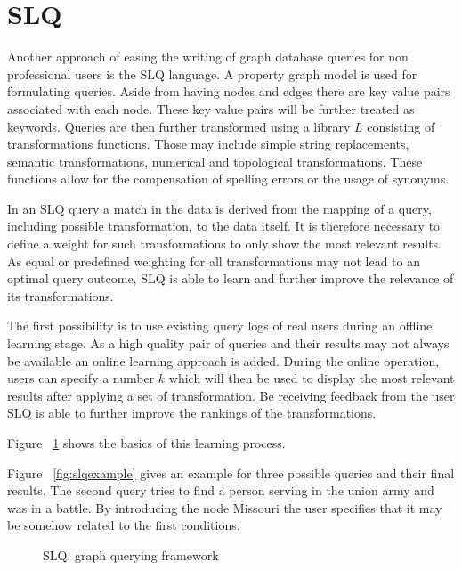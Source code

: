 \documentclass{sig-alternate}
\begin{document}
\section{SLQ}
Another approach of easing the writing of graph database queries for non
professional users is the SLQ language. 
A property graph model is used for formulating queries. Aside
from having nodes and edges there are key value pairs associated with
each node. These key value pairs will be further treated as keywords.
Queries are then further transformed using a library $L$ consisting of transformations
functions. Those may include simple string replacements, semantic transformations,
numerical and topological transformations.
These functions allow for the compensation of spelling errors or the
usage of synonyms.

In an SLQ query a match in the data is derived from the mapping
of a query, including possible transformation, to the data itself. It is therefore necessary 
to define a weight for such transformations to only show the most relevant results.
As equal or predefined weighting for all transformations may not lead to an optimal 
query outcome, SLQ is able to learn and further improve the relevance of its transformations.

The first possibility is to use existing query logs of real users during an offline learning stage.
As a high quality pair of queries and their results may not always be available an online learning approach
is added. During the online operation, users can specify a number $k$ which will then be used
to display the most relevant results after applying a set of transformation. Be receiving 
feedback from the user SLQ is able to further improve the rankings of the transformations.

Figure ~\ref{fig:slqlearning} shows the basics of this learning process.

Figure ~\ref{fig:slqexample} gives an example for three possible queries and their final results.
The second query tries to find a person serving in the union army and was in a battle. By introducing 
the node Missouri the user specifies that it may be somehow related to the first conditions.

\begin{figure}
\centering
{}
\caption{SLQ: graph querying framework}
\label{fig:slqlearning}
\end{figure}
\end{document}
